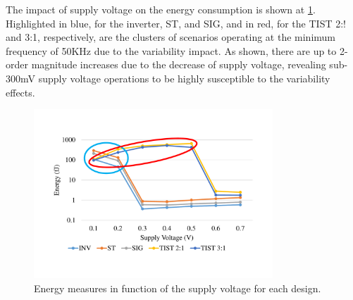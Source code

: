\documentclass[pgmicro,mestrado,english]{iiufrgs}
\begin{document}
The impact of supply voltage on the energy consumption is shown at \ref{fig:energySupplyStep}. Highlighted in blue, for the inverter, ST, and SIG, and in red, for the TIST 2:! and 3:1, respectively, are the clusters of scenarios operating at the minimum frequency of 50KHz due to the variability impact. As shown, there are up to 2-order magnitude increases due to the decrease of supply voltage, revealing sub-300mV supply voltage operations to be highly susceptible to the variability effects.


\begin{figure}[h]
	\centering
		\includegraphics[width=0.8\textwidth, trim={2cm 3cm 2cm 3cm}, clip]{energyIncreaseSupply.pdf}
		\caption{Energy measures in function of the supply voltage for each design.}
	\label{fig:energySupplyStep}
\end{figure}

\end{document}
